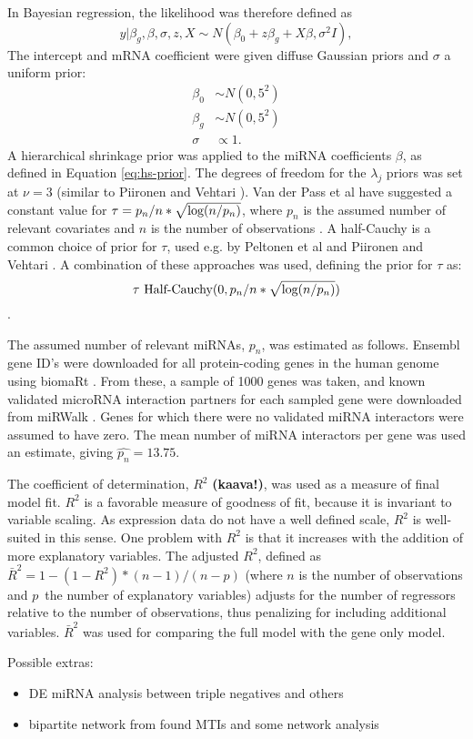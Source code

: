 In Bayesian regression, the likelihood was therefore defined as
\begin{equation}
	y | \beta_g, \beta, \sigma, z, X \sim N(\beta_0 + z \beta_g + X \beta, \sigma^2I),
\end{equation}
The intercept and mRNA coefficient were given diffuse Gaussian priors
and $\sigma$ a uniform prior:
\begin{subequations}
  \begin{align}
    \beta_0 & \sim N(0, 5^2) \\
    \beta_g & \sim N(0, 5^2) \\
    \sigma  & \propto 1.
  \end{align}
\end{subequations}
A hierarchical shrinkage prior was applied to the miRNA coefficients $\beta$,
as defined in Equation \eqref{eq:hs-prior}. The degrees of freedom for the
$\lambda_j$ priors was set at $\nu=3$ (similar to Piironen and Vehtari
\citep{Piironen2015}). Van der Pass et al have suggested a constant value for $\tau =
p_n/n*\sqrt{\textup{log}(n/p_n)}$, where $p_n$ is the assumed number of
relevant covariates and $n$ is the number of observations
\citep{vanDerPassXXXX}. A half-Cauchy is a common choice of prior for $\tau$,
used e.g. by Peltonen et al \citep{PeltonenXXXX} and Piironen and Vehtari
\citep{Piironen2015}. A combination of these approaches was used,
defining the prior for $\tau$ as:
\begin{equation}
    \tau ~ \textup{Half-Cauchy}(0, p_n/n*\sqrt{\textup{log}(n/p_n)})
\end{equation}.

The assumed number of relevant miRNAs, $p_n$, was estimated as follows.
Ensembl gene ID's were downloaded for all protein-coding genes in the human
genome using biomaRt \citep{biomaRt}. From these, a sample of 1000 genes was
taken, and known validated microRNA interaction partners for each sampled gene
were downloaded from miRWalk \citep{Dweep2015}. Genes for which there were no
validated miRNA interactors were assumed to have zero. The mean number of
miRNA interactors per gene was used an estimate, giving
$\hat{p_n} = 13.75$.

The coefficient of determination, $R^2$ \textbf{(kaava!)}, was used as a measure of final model
fit. $R^2$ is a favorable measure of goodness of fit, because it is invariant
to variable scaling. As expression data do not have a well defined scale,
$R^2$ is well-suited in this sense. One problem with $R^2$ is that it
increases with the addition of more explanatory variables. The adjusted $R^2$,
defined as $\bar{R}^2 = 1-(1-R^2)*(n-1)/(n-p)$ (where $n$ is the number of
observations and $p$ the number of explanatory variables) adjusts for the
number of regressors relative to the number of observations, thus penalizing
for including additional variables. $\bar{R}^2$ was used for comparing the
full model with the gene only model.

Possible extras:
\begin{itemize}
	\item DE miRNA analysis between triple negatives and others
	\item bipartite network from found MTIs and some network analysis
\end{itemize}
